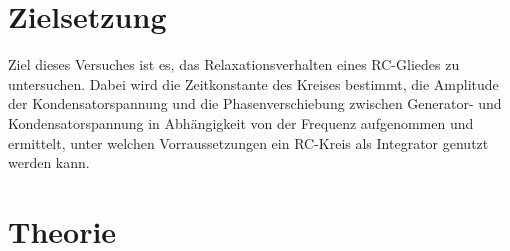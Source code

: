 \maketitle
\tableofcontents
\newpage

\section{Zielsetzung}
Ziel dieses Versuches ist es, das Relaxationsverhalten eines RC-Gliedes zu
untersuchen. Dabei wird die Zeitkonstante des Kreises bestimmt, die Amplitude
der Kondensatorspannung und die Phasenverschiebung zwischen Generator- und Kondensatorspannung
in Abhängigkeit von der Frequenz aufgenommen und ermittelt, unter welchen Vorraussetzungen
ein RC-Kreis als Integrator genutzt werden kann.
\section{Theorie}
